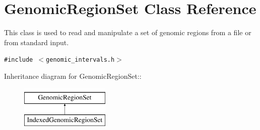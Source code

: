 \hypertarget{classGenomicRegionSet}{
\section{GenomicRegionSet Class Reference}
\label{classGenomicRegionSet}
}
This class is used to read and manipulate a set of genomic regions from a file or from standard input.  


{\tt \#include $<$genomic\_\-intervals.h$>$}

Inheritance diagram for GenomicRegionSet::\begin{figure}[H]
\begin{center}
\leavevmode
\includegraphics[height=2cm]{classGenomicRegionSet}
\end{center}
\end{figure}
